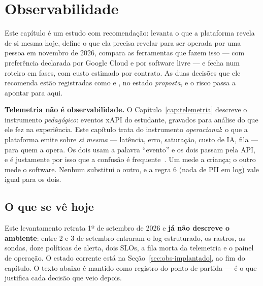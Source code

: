 \chapter{Observabilidade}
\label{cap:observabilidade}

Este capítulo é um estudo com recomendação: levanta o que a plataforma revela
de si mesma hoje, define o que ela precisa revelar para ser operada por uma
pessoa em novembro de 2026, compara as ferramentas que fazem isso --- com
preferência declarada por Google Cloud e por software livre --- e fecha num
roteiro em fases, com custo estimado por contrato. As duas decisões que ele
recomenda estão registradas como  e , no estado
\emph{proposta}, e o risco  passa a apontar para aqui.

\begin{decisao}
\textbf{Telemetria não é observabilidade.} O Capítulo~\ref{cap:telemetria}
descreve o instrumento \emph{pedagógico}: eventos xAPI do estudante, gravados
para análise do que ele fez na experiência. Este capítulo trata do instrumento
\emph{operacional}: o que a plataforma emite sobre \emph{si mesma} --- latência,
erro, saturação, custo de IA, fila --- para quem a opera. Os dois usam a palavra
\enquote{evento} e os dois passam pela API, e é justamente por isso que a
confusão é frequente~\cite{majors2022observability}. Um mede a criança; o
outro mede o software. Nenhum substitui o outro, e a regra 6 (nada de PII em log) vale igual para os dois.
\end{decisao}

\section{O que se vê hoje}

\begin{nota}
Este levantamento retrata 1º de setembro de 2026 e \textbf{já não descreve o
ambiente}: entre 2 e 3 de setembro entraram o log estruturado, os rastros, as
sondas, doze políticas de alerta, dois SLOs, a fila morta da telemetria e o
painel de operação. O estado corrente está na
Seção~\ref{sec:obs-implantado}, ao fim do capítulo. O texto abaixo é mantido
como registro do ponto de partida --- é o que justifica cada decisão que veio
depois.
\end{nota}

